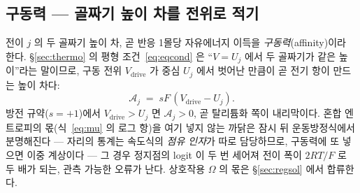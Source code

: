 \documentclass[11pt,a4paper]{article}
\newcommand{\drive}{\mathrm{drive}}
\begin{document}
\subsection{구동력 — 골짜기 높이 차를 전위로 적기}
전이 $j$ 의 두 골짜기 높이 차, 곧 반응 1몰당 자유에너지 이득을 \emph{구동력}(affinity)이라 한다.
\S\ref{sec:thermo} 의 평형 조건~\eqref{eq:eqcond} 은 ``$V=U_j$ 에서 두 골짜기가 같은 높이''라는 말이므로,
구동 전위 $V_\drive$ 가 중심 $U_j$ 에서 벗어난 만큼이 곧 전기 항이 만드는 높이 차다:
\begin{equation}
\mathcal A_j\;=\;sF\,(V_\drive-U_j).
\label{eq:affinity}
\end{equation}
방전 규약($s=+1$)에서 $V_\drive>U_j$ 면 $\mathcal A_j>0$, 곧 탈리튬화 쪽이 내리막이다. 혼합 엔트로피의
몫(식~\eqref{eq:mu} 의 로그 항)을 여기 넣지 않는 까닭은 잠시 뒤 운동방정식에서 분명해진다 — 자리의 통계는
속도식의 \emph{점유 인자}가 따로 담당하므로, 구동력에 또 넣으면 이중 계상이다 — 그 경우
정지점의 logit 이 두 번 세어져 전이 폭이 $2RT/F$ 로 두 배가 되는, 관측 가능한 오류가 난다. 상호작용 $\Omega$ 의
몫은 \S\ref{sec:regsol} 에서 합류한다.
\end{document}
